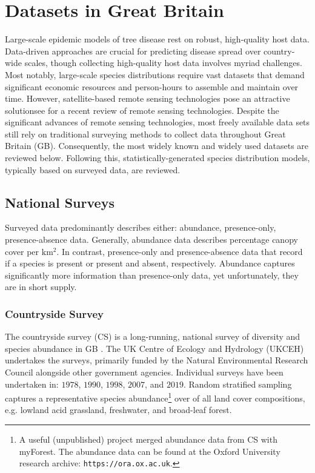 \section{Datasets in Great Britain}
\label{ch2:hostdata}

Large-scale epidemic models of tree disease rest on robust, high-quality host data.
Data-driven approaches are crucial for predicting disease spread over country-wide scales, 
though collecting high-quality host data involves myriad challenges. 
Most notably, large-scale species distributions require vast datasets that demand significant economic resources
and person-hours to assemble and maintain over time. 
However, satellite-based remote sensing technologies pose an attractive solution\textemdash see \cite{camarretta2020monitoring} for a recent review of remote sensing technologies.
Despite the significant advances of remote sensing technologies, most freely available data sets still rely on traditional surveying methods to collect data throughout Great Britain (GB).
Consequently, the most widely known and widely used datasets are reviewed below.
Following this, statistically-generated species distribution models, typically based on surveyed data, are reviewed.

\subsection{National Surveys}

Surveyed data predominantly describes either: abundance, presence-only, presence-absence data. 
Generally, abundance data describes percentage canopy cover per $\mathrm{km^2}$.
In contrast, presence-only and presence-absence data that record if a species is present or present and absent, respectively.
Abundance captures significantly more information than presence-only data, yet unfortunately, they are in short supply.

\subsubsection{Countryside Survey}

The countryside survey (CS) is a long-running, national survey of diversity and species abundance in GB \cite{wood2017long}.
The UK Centre of Ecology and Hydrology (UKCEH) undertakes the surveys, primarily funded by the Natural Environmental Research Council alongside other government agencies.
Individual surveys have been undertaken in: $1978$, $1990$, $1998$, $2007$, and $2019$. 
Random stratified sampling captures a representative species abundance\footnote{
A useful (unpublished) project merged abundance data from CS with myForest. The abundance data can be found at the Oxford University research archive: \nolinkurl{https://ora.ox.ac.uk}.} 
over of all land cover compositions, e.g. lowland acid grassland, freshwater, and broad-leaf forest.


